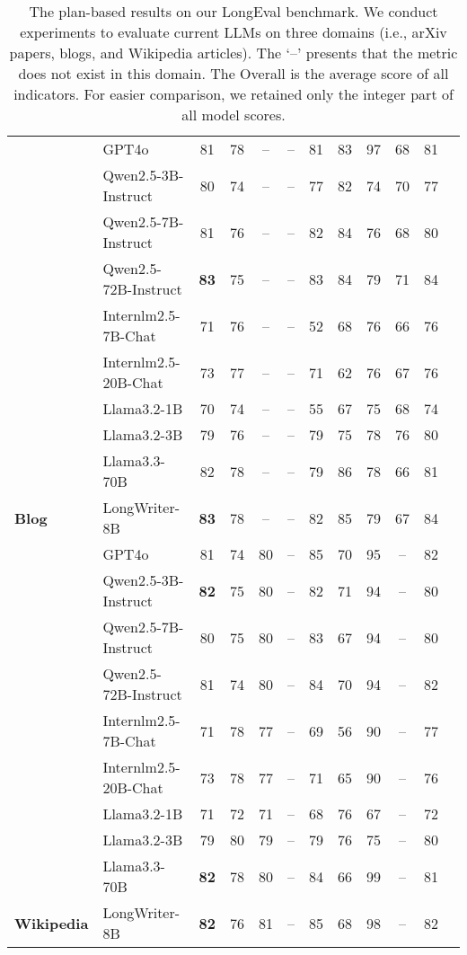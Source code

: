 \begin{table*}[hbt!]
\begin{center}
{\begin{tabular}{l|l|c|ccccccccc}
\midrule
& GPT4o	&81	&78	&--&	--&	81	&83	&97	&68	&81	  \\
 &Qwen2.5-3B-Instruct	&80	&74	&--&	--&	77&	82&	74&	70&	77 \\
&Qwen2.5-7B-Instruct	& 81	&76&	--	&--	&82	&84	&76	&68	&80\\
&Qwen2.5-72B-Instruct&\textbf{83}	&75	&--	&--	&83	&84	&79	&71	&84\\
&Internlm2.5-7B-Chat&71	&76	&--	&--	&52	&68	&76	&66	&76	\\
&Internlm2.5-20B-Chat	&73	&77	&--	&--	&71	&62	&76	&67	&76 \\
&Llama3.2-1B	&70	&74	&--	&--	&55	&67	&75	&68	&74 \\
&Llama3.2-3B&79	&76	&--&--	&79	&75	&78	&76	&80 \\
& Llama3.3-70B &82	&78	&--	&--	&79	&86	&78	&66	&81\\
\multirow{-10}{*}{\textbf{Blog}}& LongWriter-8B	&\textbf{83}	&78	&--	&--	&82	&85	&79	&67	&84\\

\midrule
& GPT4o	&	81	&74	&80	&--	&85	&70	&95	&--	&82  \\
&Qwen2.5-3B-Instruct	&\textbf{82}	&75	&80	&--	&82	&71	&94	&--	&80\\
&Qwen2.5-7B-Instruct	&80	&75	&80	&--	&83	&67	&94&	--	&80 \\
&Qwen2.5-72B-Instruct	&81	&74&	80&	--&	84	&70	&94&--	&82\\
&Internlm2.5-7B-Chat&	71	&78	&77&	--	&69	&56	&90&	--&77\\
&Internlm2.5-20B-Chat	&73	&78	&77&	--	&71&	65	&90	&--	&76\\
&Llama3.2-1B	&71	&72	&71&	--&	68	&76	&67&	--	&72 \\
&Llama3.2-3B	&79&	80	&79	&--	&79	&76&	75&	--	&80\\
&Llama3.3-70B& \textbf{82}	&78	&80&	--	&84	&66	&99&	--	&81\\

\multirow{-10}{*}{\textbf{Wikipedia}}&	 LongWriter-8B	&\textbf{82}	&76	&81	&--	&85&	68	&98	&--	&82 \\


\bottomrule
\end{tabular}
}
\end{center}
\caption{
The plan-based results on our LongEval benchmark. We conduct experiments to evaluate current LLMs on three domains (i.e., arXiv papers, blogs, and Wikipedia articles). The `--' presents that the metric does not exist in this domain. The Overall is the average score of all indicators. For easier comparison, we retained only the integer part of all model scores.
}
\label{tab:Main Result}
\end{table*}